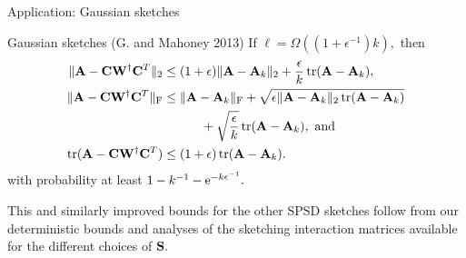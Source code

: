 \documentclass[xcolor=x11names,compress,ignorenonframetext,10pt]{beamer}
\renewcommand{\(}{\begin{columns}}
\renewcommand{\)}{\end{columns}}
\newcommand{\<}[1]{\begin{column}{#1}}
\renewcommand{\>}{\end{column}}
\def\refcolor{DodgerBlue4}
\newcommand{\refer}[1]{({\color{\refcolor}#1})}
\begin{document}
 
 \begin{frame}{Application: Gaussian sketches}

  \begin{block}{Gaussian sketches \refer{G. and Mahoney 2013}}
  If $\ell = \Omega((1 + \epsilon^{-1}) k),$ then
  \begin{align*}
   \|\mathbf{A} - \mathbf{C} \mathbf{W}^\dagger \mathbf{C}^T\|_2 & \leq (1 + \epsilon) \|\mathbf{A} - \mathbf{A}_k\|_2 + \frac{\epsilon}{k}\operatorname{tr}(\mathbf{A} - \mathbf{A}_k), \\
  \|\mathbf{A} - \mathbf{C} \mathbf{W}^\dagger \mathbf{C}^T\|_{\mathrm{F}} & \leq \|\mathbf{A} - \mathbf{A}_k\|_{\mathrm{F}} + \sqrt{\epsilon \|\mathbf{A} - \mathbf{A}_k\|_2 \operatorname{tr}(\mathbf{A} - \mathbf{A}_k)} \\
  & \quad \quad \quad  + \sqrt{\frac{\epsilon}{k}}\operatorname{tr}(\mathbf{A} - \mathbf{A}_k), \text{ and} \\
   \operatorname{tr}(\mathbf{A} - \mathbf{C} \mathbf{W}^\dagger \mathbf{C}^T) & \leq (1 + \epsilon)\operatorname{tr}(\mathbf{A} - \mathbf{A}_k).
  \end{align*}
  with probability at least $1 - k^{-1} - \mathrm{e}^{-k\epsilon^{-1}}.$
  \end{block}

  This and similarly improved bounds for the other SPSD sketches follow from our deterministic bounds and analyses of the
  sketching interaction matrices available for the different choices of $\mathbf{S}.$
\end{frame}
%  
% 
% 
% 
%   
\end{document}
